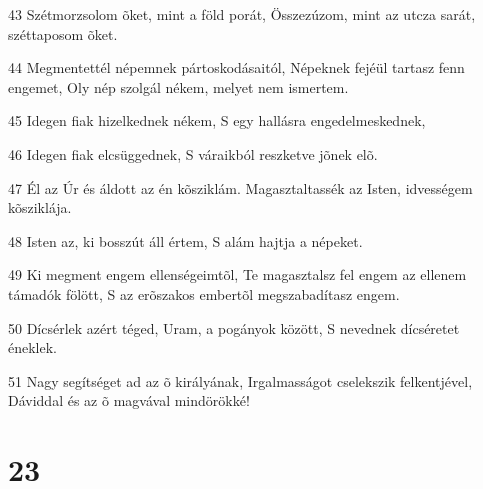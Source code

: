 \par 43 Szétmorzsolom õket, mint a föld porát, Összezúzom, mint az utcza sarát, széttaposom õket.
\par 44 Megmentettél népemnek pártoskodásaitól, Népeknek fejéül tartasz fenn engemet, Oly nép szolgál nékem, melyet nem ismertem.
\par 45 Idegen fiak hizelkednek nékem, S egy hallásra engedelmeskednek,
\par 46 Idegen fiak elcsüggednek, S váraikból reszketve jõnek elõ.
\par 47 Él az Úr és áldott az én kõsziklám. Magasztaltassék az Isten, idvességem kõsziklája.
\par 48 Isten az, ki bosszút áll értem, S alám hajtja a népeket.
\par 49 Ki megment engem ellenségeimtõl, Te magasztalsz fel engem az ellenem támadók fölött, S az erõszakos embertõl megszabadítasz engem.
\par 50 Dícsérlek azért téged, Uram, a pogányok között, S nevednek dícséretet éneklek.
\par 51 Nagy segítséget ad az õ királyának, Irgalmasságot cselekszik felkentjével, Dáviddal és az õ magvával mindörökké!

\chapter{23}

